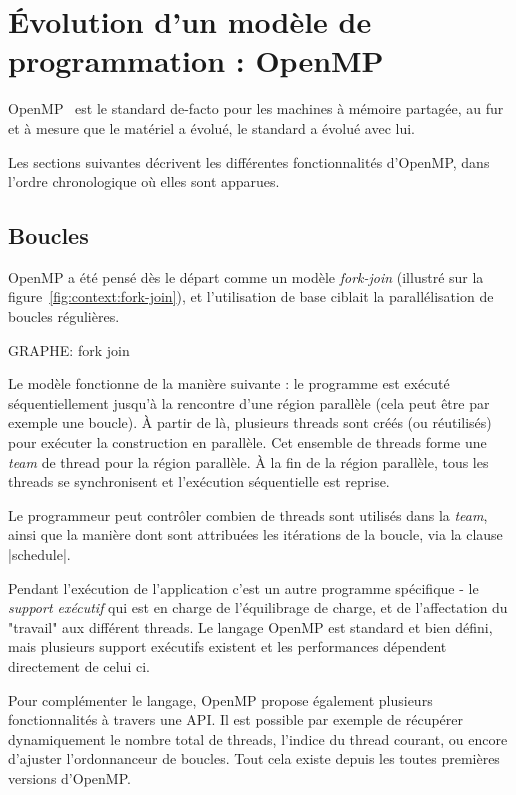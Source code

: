 \section{Évolution d'un modèle de programmation : OpenMP}\label{sec:context:openmp}

OpenMP~\cite{openmp45} est le standard de-facto pour les machines à mémoire partagée, au fur et à mesure que le matériel a évolué, le standard a évolué avec lui.

Les sections suivantes décrivent les différentes fonctionnalités d'OpenMP, dans l'ordre chronologique où elles sont apparues.

\subsection{Boucles}

OpenMP a été pensé dès le départ comme un modèle \emph{fork-join} (illustré sur la figure~\ref{fig:context:fork-join}), et l'utilisation de base ciblait la parallélisation de boucles régulières.

GRAPHE: \label{fig:context:fork-join}fork join

Le modèle fonctionne de la manière suivante : le programme est exécuté séquentiellement jusqu'à la rencontre d'une région parallèle (cela peut être par exemple une boucle).
À partir de là, plusieurs threads sont créés (ou réutilisés) pour exécuter la construction en parallèle. Cet ensemble de threads forme une \emph{team} de thread pour la région parallèle.
À la fin de la région parallèle, tous les threads se synchronisent et l'exécution séquentielle est reprise.

Le programmeur peut contrôler combien de threads sont utilisés dans la \emph{team}, ainsi que la manière dont sont attribuées les itérations de la boucle, via la clause |schedule|.

Pendant l'exécution de l'application c'est un autre programme spécifique - le \emph{support exécutif} qui est en charge de l'équilibrage de charge, et de l'affectation du "travail" aux différent threads.
Le langage OpenMP est standard et bien défini, mais plusieurs support exécutifs existent et les performances dépendent directement de celui ci.

Pour complémenter le langage, OpenMP propose également plusieurs fonctionnalités à travers une API. Il est possible par exemple de récupérer dynamiquement le nombre total de threads, l'indice du thread courant, ou encore d'ajuster l'ordonnanceur de boucles.
Tout cela existe depuis les toutes premières versions d'OpenMP.

